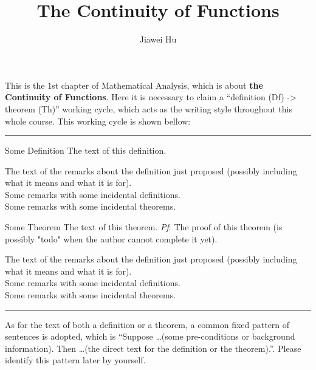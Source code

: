 \documentclass{article}
\title{\LARGE \textbf{The Continuity of Functions}}
\author{\large Jiawei Hu}
\begin{document}
\maketitle

This is the 1st chapter of Mathematical Analysis, which is about \textbf{the Continuity of Functions}. Here it is necessary to claim a ``definition (Df) -> theorem (Th)'' working cycle, which acts as the writing style throughout this whole course. This working cycle is shown bellow:

\noindent\rule{\textwidth}{2pt}
\begin{Df}{Some Definition}
    The text of this definition.
\end{Df}

\begin{Rmk}{}
    The text of the remarks about the definition just proposed (possibly including what it means and what it is for).\\
    \textcolor{Df}{Some remarks with some incidental definitions.}\\
    \textcolor{Th}{Some remarks with some incidental theorems.}
\end{Rmk}

\begin{Th}{Some Theorem}
    The text of this theorem.
    \tcblower
    \textit{Pf}: The proof of this theorem (is possibly "todo" when the author cannot complete it yet).
\end{Th}

\begin{Rmk}{}
    The text of the remarks about the definition just proposed (possibly including what it means and what it is for).\\
    \textcolor{Df}{Some remarks with some incidental definitions.}\\
    \textcolor{Th}{Some remarks with some incidental theorems.}
\end{Rmk}
\noindent\rule{\textwidth}{2pt}
As for the text of both a definition or a theorem, a common fixed pattern of sentences is adopted, which is ``Suppose \dots (some pre-conditions or background information). Then \dots (the direct text for the definition or the theorem).''. Please identify this pattern later by yourself. 
\end{document}

